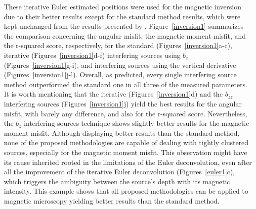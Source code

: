 These iterative Euler estimated positions were used for the magnetic inversion due to their better results except for the standard method results, which were kept unchanged from the results presented by \citet{Souza-Junior2023b}. Figure~\ref{inversion1} summarizes the comparison concerning the angular misfit, the magnetic moment misfit, and the r-squared score, respectively, for the standard (Figures~\ref{inversion1}a-c), iterative (Figures~\ref{inversion1}d-f) interfering sources using $b_z$ (Figures~\ref{inversion1}g-i), and interfering sources using the vertical derivative (Figures~\ref{inversion1}j-l). Overall, as predicted, every single interfering source method outperformed the standard one in all three of the measured parameters. It is worth mentioning that the iterative (Figures~\ref{inversion1}d) and the $b_{zz}$ interfering sources (Figures~\ref{inversion1}j) yield the best results for the angular misfit, with barely any difference, and also for the r-squared score. Nevertheless, the $b_{z}$ interfering sources technique shows slightly better results for the magnetic moment misfit. Although displaying better results than the standard method, none of the proposed methodologies are capable of dealing with tightly clustered sources, especially for the magnetic moment misfit. This observation might have its cause inherited rooted in the limitations of the Euler deconvolution, even after all the improvement of the iterative Euler deconvolution (Figures~\ref{euler1}c), which triggers the ambiguity between the source's depth with its magnetic intensity. This example shows that all proposed methodologies can be applied to magnetic microscopy yielding better results than the standard method.



